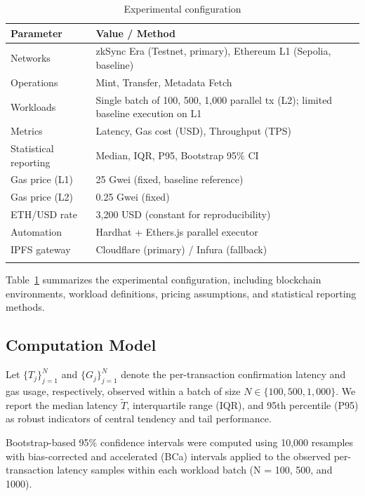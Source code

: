 \documentclass[pdflatex,sn-mathphys-num]{sn-jnl}
\begin{document}
\begin{table}[t]
\caption{Experimental configuration}\label{tab:config}
\begin{tabular*}{\textwidth}{@{\extracolsep\fill}lp{9.5cm}}
\toprule
\textbf{Parameter} & \textbf{Value / Method} \\
\midrule
Networks & zkSync Era (Testnet, primary), Ethereum L1 (Sepolia, baseline) \\
Operations & Mint, Transfer, Metadata Fetch \\
Workloads & Single batch of 100, 500, 1{,}000 parallel tx (L2); limited baseline execution on L1 \\
Metrics & Latency, Gas cost (USD), Throughput (TPS) \\
Statistical reporting & Median, IQR, P95, Bootstrap 95\% CI \\
Gas price (L1) & 25 Gwei (fixed, baseline reference) \\
Gas price (L2) & 0.25 Gwei (fixed) \\
ETH/USD rate & 3{,}200 USD (constant for reproducibility) \\
Automation & Hardhat + Ethers.js parallel executor \\
IPFS gateway & Cloudflare (primary) / Infura (fallback) \\
\botrule
\end{tabular*}
\end{table}

Table~\ref{tab:config} summarizes the experimental configuration, including blockchain environments, workload definitions, pricing assumptions, and statistical reporting methods.

\subsection{Computation Model}

Let $\{T_j\}_{j=1}^{N}$ and $\{G_j\}_{j=1}^{N}$ denote the per-transaction confirmation latency and gas usage, respectively, observed within a batch of size $N \in \{100, 500, 1{,}000\}$. We report the median latency $\tilde{T}$, interquartile range (IQR), and 95th percentile (P95) as robust indicators of central tendency and tail performance.

Bootstrap-based 95\% confidence intervals were computed using 10{,}000 resamples with bias-corrected and accelerated (BCa) intervals applied to the observed per-transaction latency samples within each workload batch (N = 100, 500, and 1000).
\end{document}
